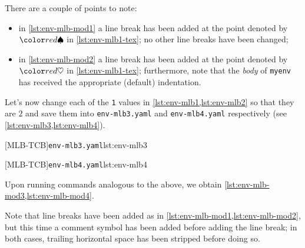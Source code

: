 	There are a couple of points to note:
	\begin{itemize}
		\item in \cref{lst:env-mlb-mod1} a line break has been added at the point denoted by $\BeginStartsOnOwnLine$ in \cref{lst:env-mlb1-tex}; no
		      other line breaks have been changed;
		\item in \cref{lst:env-mlb-mod2} a line break has been added at the point denoted by $\BodyStartsOnOwnLine$ in \cref{lst:env-mlb1-tex};
		      furthermore, note that the \emph{body} of \texttt{myenv} has received the appropriate (default) indentation.
	\end{itemize}

	Let's now change each of the \texttt{1} values in \cref{lst:env-mlb1,lst:env-mlb2} so that they are $2$ and
	save them into \texttt{env-mlb3.yaml} and \texttt{env-mlb4.yaml} respectively (see \cref{lst:env-mlb3,lst:env-mlb4}).

	\begin{minipage}{.45\textwidth}
		[MLB-TCB]{\texttt{env-mlb3.yaml}}{lst:env-mlb3}
	\end{minipage}
	\hfill
	\begin{minipage}{.45\textwidth}
		[MLB-TCB]{\texttt{env-mlb4.yaml}}{lst:env-mlb4}
	\end{minipage}

	Upon running  commands analogous to the above, we obtain \cref{lst:env-mlb-mod3,lst:env-mlb-mod4}.

	\begin{sidebyside}
		\begin{minipage}{.57\linewidth}
		\end{minipage}
		\hfill
		\begin{minipage}{.42\linewidth}
		\end{minipage}
	\end{sidebyside}

	Note that line breaks have been added as in \cref{lst:env-mlb-mod1,lst:env-mlb-mod2}, but this time a comment symbol
	has been added before adding the line break; in both cases, trailing horizontal
	space has been stripped before doing so.

